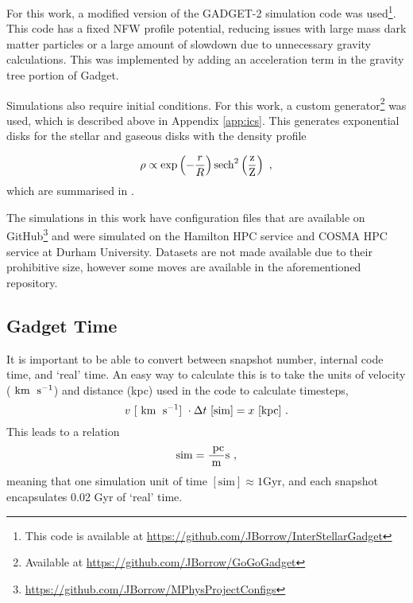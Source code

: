 For this work, a modified version of the GADGET-2 simulation code \citep{springel_cosmological_2005} was
used\footnote{This code is available at
  \url{https://github.com/JBorrow/InterStellarGadget}}. This code has a fixed
NFW profile potential, reducing issues with large mass dark matter
particles or a large amount of slowdown due to unnecessary gravity
calculations. This was implemented by adding an acceleration term in the
gravity tree portion of Gadget.

Simulations also require initial conditions. For this work, a custom
generator\footnote{Available at \url{https://github.com/JBorrow/GoGoGadget}}
was used, which is described above in Appendix \ref{app:ics}. This generates exponential disks for the stellar and gaseous
disks with the density profile

\begin{equation}
\rho \propto \exp\left(-\frac{r}{R}\right)\rm{sech}^2\left(\frac{z}{Z}\right)~,
\end{equation}
which are summarised in \citet{ferriere_interstellar_2001}.

The simulations in this work have configuration files that are
available on GitHub\footnote{\url{https://github.com/JBorrow/MPhysProjectConfigs}} and were simulated on the
Hamilton HPC service and COSMA HPC service at Durham University. Datasets are not made
available due to their prohibitive size, however some moves are
available in the aforementioned repository.

\subsection{Gadget Time}
\label{app:gadgettime}

It is important to be able to convert between snapshot number, internal code time, and `real' time.
An easy way to calculate this is to take the units of velocity ($~\mathrm{km}\;~\mathrm{s}^{-1}$) and distance (kpc) used in the code to calculate timesteps,
$$
    v ~ [~\mathrm{km}\;~\mathrm{s}^{-1}] ~ \cdot \Delta t ~ [\mathrm{sim}] = x ~ [\mathrm{kpc}]~.
$$
This leads to a relation
$$
    \mathrm{sim} = \frac{~\mathrm{pc}}{\mathrm{m}} \mathrm{s}~,
$$
meaning that one simulation unit of time $[\mathrm{sim}] \approx 1 \mathrm{Gyr}$, and each snapshot encapsulates 0.02 Gyr of `real' time.
